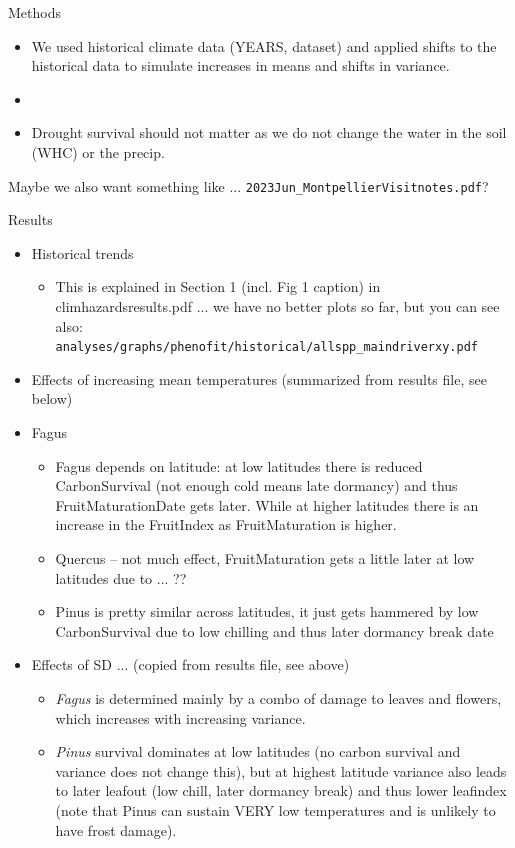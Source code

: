 \documentclass[11pt,letter]{article}
\begin{document}
Methods
\begin{itemize}
\item We used historical climate data (YEARS, dataset) and applied shifts to the historical data to simulate increases in means and shifts in variance. 
\item 
\item Drought survival should not matter as we do not change the water in the soil (WHC) or the precip. 
\end{itemize}

Maybe we also want something like ... \verb|2023Jun_MontpellierVisitnotes.pdf|?

Results
\begin{itemize}
\item Historical trends
\begin{itemize}
\item This is explained in Section 1 (incl. Fig 1 caption) in climhazardsresults.pdf ... we have no better plots so far, but you can see also: \\ \verb|analyses/graphs/phenofit/historical/allspp_maindriverxy.pdf|
\end{itemize}
\item Effects of increasing mean temperatures (summarized from results file, see below) %
\item Fagus 
\begin{itemize}
\item Fagus depends on latitude:  at low latitudes there is reduced CarbonSurvival (not enough cold means late dormancy) and thus FruitMaturationDate gets later. While at higher latitudes there is an increase in the FruitIndex as FruitMaturation is higher. 
\item Quercus -- not much effect, FruitMaturation gets a little later at low latitudes due to ... ??
\item Pinus is pretty similar across latitudes, it just gets hammered by low CarbonSurvival due to low chilling and thus later dormancy break date
\end{itemize}
\item Effects of SD ... (copied from results file, see above)
\begin{itemize}
\item \emph{Fagus} is determined mainly by a combo of damage to leaves and flowers, which increases with increasing variance. 
\item \emph{Pinus} survival dominates at low latitudes (no carbon survival and variance does not change this), but at highest latitude variance also leads to later leafout (low chill, later dormancy break) and thus lower leafindex (note that Pinus can sustain VERY low temperatures and is unlikely to have frost damage). 

\end{itemize}
\end{itemize}
\end{document}
